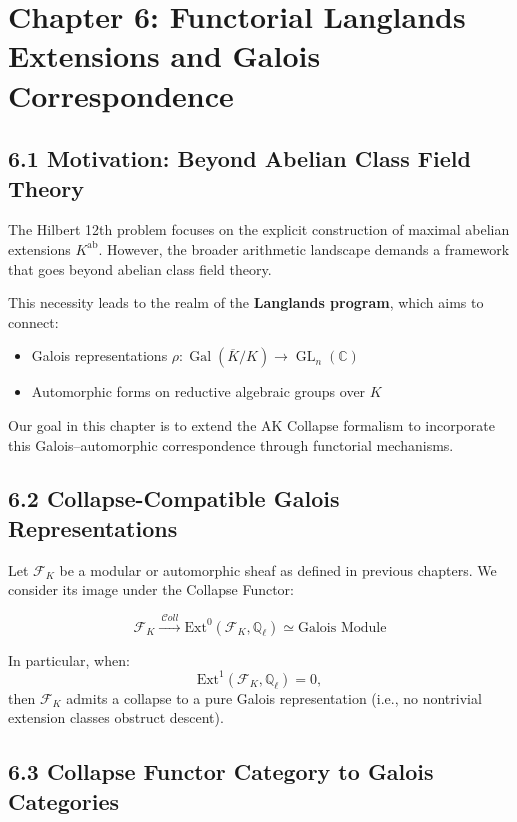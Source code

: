 \documentclass[11pt]{article}
\begin{document}
\section{Chapter 6: Functorial Langlands Extensions and Galois Correspondence}

\subsection{6.1 Motivation: Beyond Abelian Class Field Theory}

The Hilbert 12th problem focuses on the explicit construction of maximal abelian extensions \( K^{\mathrm{ab}} \).  
However, the broader arithmetic landscape demands a framework that goes beyond abelian class field theory.

This necessity leads to the realm of the \textbf{Langlands program}, which aims to connect:
\begin{itemize}
    \item Galois representations \( \rho: \operatorname{Gal}(\overline{K}/K) \rightarrow \operatorname{GL}_n(\mathbb{C}) \)
    \item Automorphic forms on reductive algebraic groups over \( K \)
\end{itemize}

Our goal in this chapter is to extend the AK Collapse formalism to incorporate this Galois–automorphic correspondence through functorial mechanisms.

\subsection{6.2 Collapse-Compatible Galois Representations}

Let \( \mathcal{F}_K \) be a modular or automorphic sheaf as defined in previous chapters.  
We consider its image under the Collapse Functor:

\[
\mathcal{F}_K \xrightarrow{\ \mathcal{C}oll\ } \mathrm{Ext}^0(\mathcal{F}_K, \mathbb{Q}_\ell) \simeq \text{Galois Module}
\]

In particular, when:
\[
\mathrm{Ext}^1(\mathcal{F}_K, \mathbb{Q}_\ell) = 0,
\]
then \( \mathcal{F}_K \) admits a collapse to a pure Galois representation (i.e., no nontrivial extension classes obstruct descent).

\subsection{6.3 Collapse Functor Category to Galois Categories}
\label{subsec:collapse-functor-galois}
\end{document}
